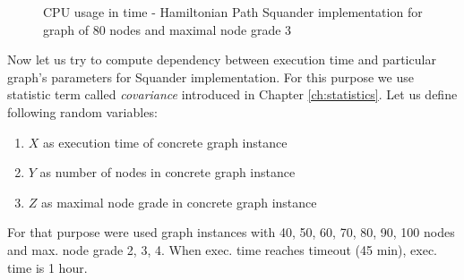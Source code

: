 \documentclass[11pt,twoside,a4paper]{book}
\begin{document}
\begin{figure}[ht]
\begin{center}

\caption{CPU usage in time - Hamiltonian Path Squander implementation for graph
of 80 nodes and maximal node grade 3}
\label{fig:hpSCpu803}
\end{center}
\end{figure}
\clearpage 

Now let us try to compute dependency between execution time and particular
graph's parameters for Squander implementation. For this purpose we use
statistic term called \textit{covariance} introduced in Chapter
\ref{ch:statistics}. Let us define following random variables:

\begin{enumerate}
  \item $X$ as execution time of concrete graph instance
  \item $Y$ as number of nodes in concrete graph instance
  \item $Z$ as maximal node grade in concrete graph instance
\end{enumerate}


For that purpose were used graph instances with 40, 50, 60, 70, 80, 90, 100
nodes and max. node grade 2, 3, 4. When exec. time reaches timeout (45
min), exec. time is 1 hour.





\end{document}
